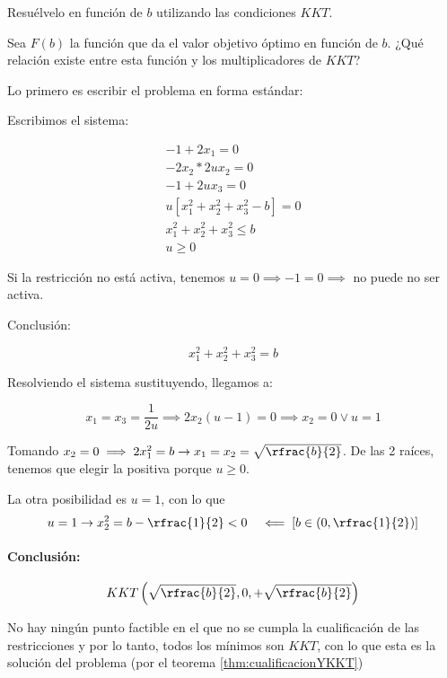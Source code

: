 \begin{problem}[1]


\ppart Resuélvelo en función de $b$ utilizando las condiciones $KKT$.

\ppart Sea $F(b)$ la función que da el valor objetivo óptimo en función de $b$. ¿Qué relación existe entre esta función y los multiplicadores de $KKT$?


\solution

Lo primero es escribir el problema en forma estándar:
\begin{ioprob}
\end{ioprob}

\spart Escribimos el sistema:

\[
	\begin{array}{c}
		-1+2x_1 = 0\\
		-2x_2*2ux_2 = 0\\
		-1+2ux_3 = 0\\
		u[x_1^2+x_2^2+x_3^2-b] = 0\\
		x_1^2+x_2^2+x_3^2≤b\\
		u≥0
	\end{array}
\]

Si la restricción no está activa, tenemos $u=0 \implies -1 = 0 \implies $ no puede no ser activa.

Conclusión:

\[x_1^2+x_2^2+x_3^2 = b\]

Resolviendo el sistema sustituyendo, llegamos a:

\[
	x_1 = x_3 = \frac{1}{2u} \implies 2x_2(u-1) = 0 \implies x_2 = 0 \vee u = 1
\]

Tomando $x_2 = 0 \implies 2x_1^2 = b \to x_1=x_2=\sqrt{\rfrac{b}{2}}$. De las 2 raíces, tenemos que elegir la positiva porque $u≥0$.

La otra posibilidad es $u=1$, con lo que 
\[
	u=1\to x^2_2=b-\rfrac{1}{2} < 0 \;\;\; \impliedby \left[b\in\left(0,\rfrac{1}{2}\right)\right]
\]


\paragraph{Conclusión:} 

\[
	KKT\left(\sqrt{\rfrac{b}{2}},0,+\sqrt{\rfrac{b}{2}}\right)
\]

\obs No hay ningún punto factible en el que no se cumpla la cualificación de las restricciones y por lo tanto, todos los mínimos son $KKT$, con lo que esta es la solución del problema (por el teorema \ref{thm:cualificacionYKKT})


\end{problem}
